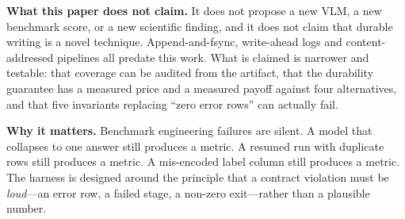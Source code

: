 \textbf{What this paper does not claim.} It does not propose a new VLM, a new benchmark score, or a new scientific finding, and it does not claim that durable writing is a novel technique. Append-and-fsync, write-ahead logs and content-addressed pipelines all predate this work. What is claimed is narrower and testable: that coverage can be audited from the artifact, that the durability guarantee has a measured price and a measured payoff against four alternatives, and that five invariants replacing ``zero error rows'' can actually fail.

\textbf{Why it matters.} Benchmark engineering failures are silent. A model that collapses to one answer still produces a metric. A resumed run with duplicate rows still produces a metric. A mis-encoded label column still produces a metric. The harness is designed around the principle that a contract violation must be \emph{loud}---an error row, a failed stage, a non-zero exit---rather than a plausible number.
